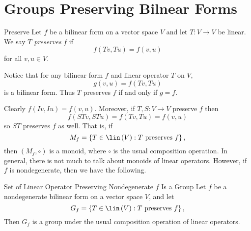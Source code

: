 \documentclass[linearalgebraII]{subfiles}
\begin{document}
    \section{Groups Preserving Bilnear Forms}

    \begin{definition}{Preserve}{}
        Let $f$ be a bilinear form on a vector space $V$ and let $T:V\to V$ be linear. We say $T$ \emph{preserves} $f$ if
        \begin{equation*}
            f\left( Tv, Tu \right) = f\left( v,u \right) 
        \end{equation*}
        for all $v,u\in V$.
    \end{definition}

    \begin{remark}
        Notice that for any bilinear form $f$ and linear operator $T$ on $V$,
        \begin{equation*}
            g\left( v,u \right) = f\left( Tv, Tu \right) 
        \end{equation*}
        is a bilinear form. Thus $T$ preserves $f$ if and only if $g=f$.
    \end{remark}

    \begin{remark}
        Clearly $f\left( Iv, Iu \right) = f\left( v,u \right)$. Moreover, if $T,S:V\to V$ preserve $f$ then
        \begin{equation*}
            f\left( STv, STu \right) = f\left( Tv, Tu \right) = f\left( v, u \right) 
        \end{equation*}
        so $ST$ preserves $f$ as well. That is, if
        \begin{equation*}
            M_f = \left\lbrace T\in\lin\left( V \right) : T\text{ preserves }f \right\rbrace,
        \end{equation*}
        then $\left( M_f, \circ \right)$ is a monoid, where $\circ$ is the usual composition operation. In general, there is not much to talk about monoids of linear operators. However, if $f$ is nondegenerate, then we have the following.
    \end{remark}

    \begin{prop}{Set of Linear Operator Preserving Nondegenerate $f$ Is a Group}
        Let $f$ be a nondegenerate bilinear form on a vector space $V$, and let
        \begin{equation*}
            G_f = \left\lbrace T\in\lin\left( V \right) : T\text{ preserves }f \right\rbrace,
        \end{equation*}
        Then $G_f$ is a group under the usual composition operation of linear operators.
    \end{prop}
\end{document}
